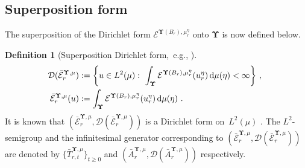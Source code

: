 \documentclass[11pt,letterpaper]{amsart}
\newcommand{\dom}[1]{\mathcal D(#1)}
\newcommand{\sem}[1]{\{#1\}_{t \ge 0}}
\newcommand{\diff}{\mathop{}\!\mathrm{d}}
\newcommand{\ttonde}[1]{\big({#1}\big)}
\newcommand{\comma}{\,\,\mathrm{,}\;\,}
\newcommand{\fstop}{\,\,\mathrm{.}}
\newcommand{\cdc}{\Gamma}
\newcommand{\EE}[2]{\mcE^{#1, #2}}
\newcommand{\QP}{{\mu}}
\newcommand{\dUpsilon}{{\mathbf \Upsilon}}
\newcommand{\U}{\dUpsilon}
\newcommand{\E}{\mathcal E}
\renewcommand{\1}{\mathbf 1}
\numberwithin{equation}{section}
\theoremstyle{plain}
\theoremstyle{definition}
\newtheorem{defs}[thm]{Definition}%
\theoremstyle{remark}
\newtheorem{rem}[thm]{\bf Remark}%
\begin{document}
\subsection{Superposition form}
The superposition of the Dirichlet form $\E^{\U(B_r), \QP_r^\eta}$ onto $\U$ is now defined below. 
\begin{defs}[Superposition Dirichlet form,~e.g., {\cite[Prop.\ V.3.1.1]{BouHir91}}] \label{d:SPF}
\begin{align} \label{eq:SP} 
\mathcal D(\bar{\E}^{\U, \mu}_r) &:= \biggl\{u \in L^2(\QP): \ \int_\dUpsilon  \E^{\U(B_r), \QP_r^\eta}(u_{r}^\eta) \diff\QP(\eta)<\infty  \biggr\} \comma
\\
\bar{\E}^{\U, \QP}_r(u) &:=\int_\dUpsilon  \E^{\U(B_r), \QP_r^\eta}(u_{r}^\eta) \diff\QP(\eta) \fstop \notag
\end{align}
It is known that $(\bar{\E}^{\U, \QP}_r,\dom{\bar{\E}^{\U, \QP}_r})$ is a Dirichlet form on~$L^2(\mu)$ \cite[Prop.\ V.3.1.1]{BouHir91}.  The $L^2$-semigroup and the infinitesimal generator corresponding to $(\bar{\E}^{\U, \QP}_r,\dom{\bar{\E}^{\U, \QP}_r})$  are denoted by $\sem{\bar{T}_{r, t}^{\U,\QP}}$ and $(\bar{A}_r^{\U, \QP}, \dom{\bar{A}_r^{\U, \QP}})$ respectively. 
\end{defs}
\end{document}
